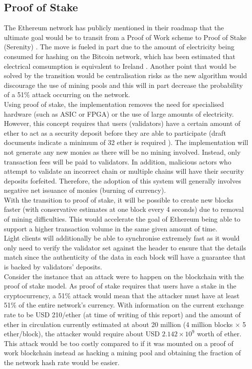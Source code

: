 \documentclass[a4paper,12pt]{article}
\begin{document}
{{\subsection{Proof of Stake}
\noindent The Ethereum network has publicly mentioned in their roadmap that the ultimate goal would be to transit from a Proof of Work scheme to Proof of Stake (Serenity) \cite{posswitch}. The move is fueled in part due to the amount of electricity being consumed for hashing on the Bitcoin network, which has been estimated that electrical comsumption is equivalent to Ireland \cite{elecbill}. Another point that would be solved by the transition would be centralisation risks as the new algorithm would discourage the use of mining pools and this will in part decrease the probability of a 51\% attack occurring on the network.\\\newline
Using proof of stake, the implementation removes the need for specialised hardware (such as \ac{ASIC} or \ac{FPGA}) or the use of large amounts of electricity. However, this concept requires that users (validators) have a certain amount of ether to act as a security deposit before they are able to participate (draft documents indicate a minimum of 32 ether is required \cite{posdraft}). The implementation will not generate any new monies as there will be no mining involved. Instead, only transaction fees will be paid to validators. In addition, malicious actors who attempt to validate an incorrect chain or multiple chains will have their security deposits forfeited. Therefore, the adoption of this system will generally involves negative net issuance of monies (burning of currency).\\\newline
With the transition to proof of stake, it will be possible to create new blocks faster (with conservative estimates at one block every 4 seconds) due to removal of mining difficulties. This would accelerate the goal of Ethereum being able to support a higher transaction volume in the same given amount of time.\\\newline
Light clients will additionally be able to synchronise extremely fast as it would only need to verify the validator set against the header to ensure that the details match since the authenticity of the data in each block will have a guarantee that is backed by validators' deposits.
\\\newline
Consider the instance that an attack were to happen on the blockchain with the proof of stake model. As proof of stake requires that users have a stake in the cryptocurrency, a 51\% attack would mean that the attacker must have at least 51\% of the entire network's currency. With information on the current exchange rate to be USD 210/ether (at time of writing of this report) and the amount of ether in circulation currently estimated at about 20 million (4 million blocks $\times$ 5 ether/block), the attacker would require about USD $2.142\times10^9$ worth of ether. This attack would be too costly compared to if it was mounted on a proof of work blockchain instead as hacking a mining pool and obtaining the fraction of the network hash rate would be easier.

}}
\end{document}
